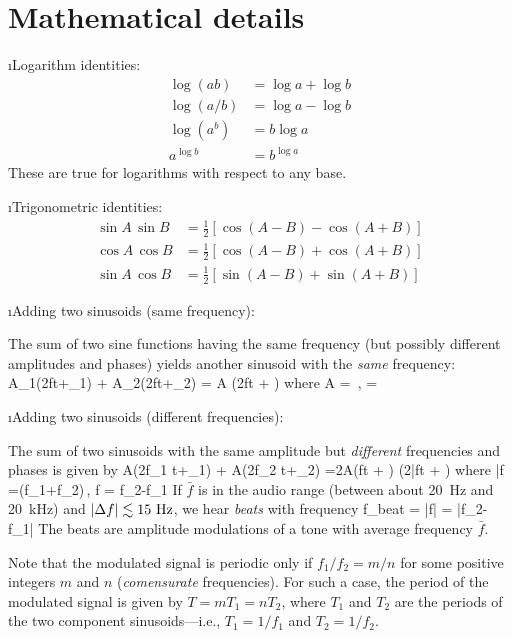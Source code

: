 \section{Mathematical details}

\bi

\i Logarithm identities:
%
\begin{align}
\log(ab)  &= \log a + \log b
\\
\log(a/b) &= \log a - \log b
\\
\log(a^b) &= b\log a
\\
a^{\log b} &= b^{\log a}
\end{align}
%
These are true for logarithms with respect to any base.

\i Trigonometric identities:
%
\begin{align}
\sin A\,\sin B &=\frac{1}{2}\left[\cos(A-B)-\cos(A+B)\right]
\\
\cos A\,\cos B &=\frac{1}{2}\left[\cos(A-B)+\cos(A+B)\right]
\\
\sin A\,\cos B &=\frac{1}{2}\left[\sin(A-B)+\sin(A+B)\right]
\end{align}
%

\i Adding two sinusoids (same frequency):

The sum of two sine functions having the same 
frequency (but possibly different amplitudes and
phases) yields another sinusoid with 
the {\em same} frequency:
%
\be
A_1\sin(2\pi ft+\phi_1) + A_2\sin(2\pi ft+\phi_2)
= A \sin(2\pi ft + \phi)
\ee
%
where
%
\be
A = \,,
\quad
\tan\phi = 
\ee

\i Adding two sinusoids (different frequencies):

The sum of two sinusoids with the same amplitude
but {\em different} frequencies and phases is given by
%
\be
A\sin(2\pi f_1 t+\phi_1) + A\sin(2\pi f_2 t+\phi_2)
=2A\cos\left(\pi\Delta ft + \right)
\sin\left(2\pi\bar ft + \right)
\ee
%
where
%
\be
\bar f =(f_1+f_2)\,,
\quad
\Delta f = f_2-f_1
\ee
%
If $\bar f$ is in the audio range (between about 20~Hz 
and 20~kHz) and $|\Delta f|\lesssim 15~{\rm Hz}$, we hear 
{\em beats} with frequency 
%
\be
f_{\rm beat} = |\Delta f| = |f_2-f_1|
\ee
%
The beats are amplitude modulations of a tone with average
frequency $\bar f$.

Note that the modulated signal is periodic only if 
$f_1/f_2 = m/n$ for some positive integers $m$ and $n$
({\em comensurate} frequencies).
For such a case, the period of the modulated signal 
is given by $T=mT_1=nT_2$, where $T_1$ and $T_2$ are the 
periods of the two component sinusoids---i.e.,
$T_1=1/f_1$ and $T_2=1/f_2$.

